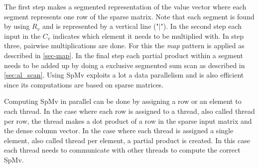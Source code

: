\begin{center}
	\label{alg-mulex}
\end{center}
The first step makes a segmented representation of the value vector where each segment represents one row of the sparse matrix.
Note that each segment is found by using $R_v$ and is represented by a vertical line ("$|$").
In the second step each input in the $C_v$ indicates which element it needs to be multiplied with.
In step three, pairwise multiplications are done.
For this the \textit{map} pattern is applied as described in \autoref{sec-map}.
In the final step each partial product within a segment needs to be added up by doing a exclusive segmented sum scan as described in \autoref{sec:al_scan}.
Using SpMv exploits a lot a data parallelism and is also efficient since its computations are based on sparse matrices.

Computing SpMv in parallel can be done by assigning a row or an element to each thread.
In the case where each row is assigned to a thread, also called thread per row, the thread makes a dot product of a row in the sparse input matrix and the dense column vector.
In the case where each thread is assigned a single element, also called thread per element, a partial product is created.
In this case each thread needs to communicate with other threads to compute the correct SpMv.

